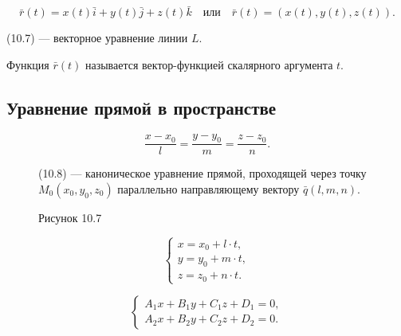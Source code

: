 \documentclass[12pt,a4paper]{article}
\newcommand{\vq}{\bar q}
\newcommand{\vr}{\bar r}
\newcommand{\vi}{\bar i}
\newcommand{\vj}{\bar j}
\newcommand{\vk}{\bar k}
\begin{document}
\begin{equation}
  \vr(t)=x(t)\vi+y(t)\vj+z(t)\vk
  \quad \text{или}\quad
  \vr(t)=(x(t),y(t),z(t)). \tag{10.7}
\end{equation}

(10.7) --- векторное уравнение линии $L$.

Функция $\vr(t)$ называется вектор-функцией скалярного аргумента $t$.

\subsection*{\textbf{Уравнение прямой в пространстве}}

\begin{equation}
  \frac{x-x_0}{l}=\frac{y-y_0}{m}=\frac{z-z_0}{n}. \tag{10.8}
\end{equation}

\begin{figure}[H]
  \centering
  \begin{minipage}{0.4\textwidth}
    \centering
    \caption*{Рисунок 10.7}
  \end{minipage}%
  \begin{minipage}{0.55\textwidth}
    (10.8) --- каноническое уравнение прямой, проходящей через точку
    $M_0(x_0,y_0,z_0)$ параллельно направляющему вектору
    $\vq(l,m,n)$.
  \end{minipage}
\end{figure}

\begin{equation}
  \begin{cases}
    x=x_0+l\cdot t,\\
    y=y_0+m\cdot t,\\
    z=z_0+n\cdot t.
  \end{cases}
  \tag{10.9}
\end{equation}

\begin{equation}
  \begin{cases}
    A_1x+B_1y+C_1z+D_1=0,\\
    A_2x+B_2y+C_2z+D_2=0.
  \end{cases}
  \tag{10.10}
\end{equation}
\end{document}
